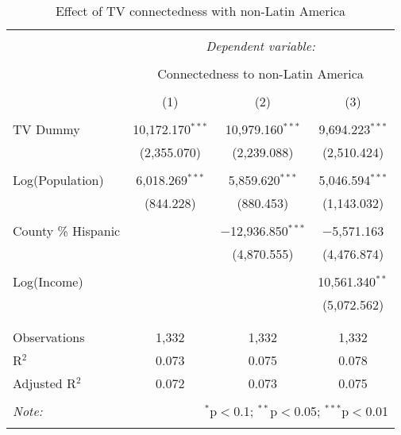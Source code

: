 
\begin{table}[!htbp] \centering 
  \caption{Effect of TV connectedness with non-Latin America} 
  \label{} 
\begin{tabular}{@{\extracolsep{-5pt}}lccc} 
\\[-1.8ex]\hline 
\hline \\[-1.8ex] 
 & \multicolumn{3}{c}{\textit{Dependent variable:}} \\ 
\cline{2-4} 
\\[-1.8ex] & \multicolumn{3}{c}{Connectedness to non-Latin America} \\ 
\\[-1.8ex] & (1) & (2) & (3)\\ 
\hline \\[-1.8ex] 
 TV Dummy & 10,172.170$^{***}$ & 10,979.160$^{***}$ & 9,694.223$^{***}$ \\ 
  & (2,355.070) & (2,239.088) & (2,510.424) \\ 
  & & & \\ 
 Log(Population) & 6,018.269$^{***}$ & 5,859.620$^{***}$ & 5,046.594$^{***}$ \\ 
  & (844.228) & (880.453) & (1,143.032) \\ 
  & & & \\ 
 County \% Hispanic &  & $-$12,936.850$^{***}$ & $-$5,571.163 \\ 
  &  & (4,870.555) & (4,476.874) \\ 
  & & & \\ 
 Log(Income) &  &  & 10,561.340$^{**}$ \\ 
  &  &  & (5,072.562) \\ 
  & & & \\ 
\hline \\[-1.8ex] 
Observations & 1,332 & 1,332 & 1,332 \\ 
R$^{2}$ & 0.073 & 0.075 & 0.078 \\ 
Adjusted R$^{2}$ & 0.072 & 0.073 & 0.075 \\ 
\hline 
\hline \\[-1.8ex] 
\textit{Note:}  & \multicolumn{3}{r}{$^{*}$p$<$0.1; $^{**}$p$<$0.05; $^{***}$p$<$0.01} \\ 
 & \multicolumn{3}{r}{} \\ 
\end{tabular} 
\end{table} 
